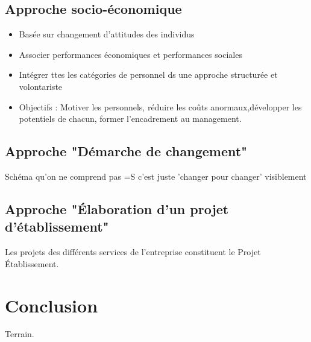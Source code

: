 		\subsection{Approche socio-économique}
		\begin{itemize}
		\item Basée sur changement d'attitudes des individus
		\item Associer performances économiques et performances sociales
		\item Intégrer ttes les catégories de personnel ds une approche structurée et volontariste 
		\item Objectifs : Motiver les personnels, réduire les coûts anormaux,développer les potentiels de chacun, former l'encadrement au management. 
		\end{itemize}
		\subsection{Approche "Démarche de changement"}
			Schéma qu'on ne comprend pas =S c'est juste 'changer pour changer' visiblement
		\subsection{Approche "Élaboration d'un projet d'établissement"}
			Les projets des différents services de l'entreprise constituent le Projet Établissement. 
	
	\section{Conclusion}
		Terrain. 
